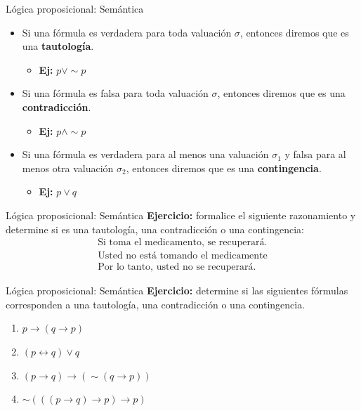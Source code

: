\documentclass{beamer}
\begin{document}
\begin{frame}{Lógica proposicional: Semántica}
  \begin{itemize}[<+->]
    \item Si una fórmula es verdadera para toda valuación $\sigma$, entonces
          diremos que es una \textbf{tautología}.
          \begin{itemize}
            \item \textbf{Ej:} $p \vee \sim p$
          \end{itemize}

    \item Si una fórmula es falsa para toda valuación $\sigma$, entonces diremos
          que es una \textbf{contradicción}.
          \begin{itemize}
            \item \textbf{Ej:} $p \land \sim p$
          \end{itemize}

    \item Si una fórmula es verdadera para al menos una valuación $\sigma_{1}$ y
          falsa para al menos otra valuación $\sigma_{2}$, entonces diremos que
          es una \textbf{contingencia}.
          \begin{itemize}
            \item \textbf{Ej:} $p \vee q$
          \end{itemize}
  \end{itemize}
\end{frame}


\begin{frame}{Lógica proposicional: Semántica}
  \textbf{Ejercicio:} formalice el siguiente razonamiento y determine si es una tautología, una contradicción o una contingencia:
  \[
    \begin{array}{c}
      \text{Si toma el medicamento, se recuperará.} \\
      \text{Usted no está tomando el medicamente} \\
      \hline
      \text{Por lo tanto, usted no se recuperará.}
    \end{array}
  \]
\end{frame}


\begin{frame}{Lógica proposicional: Semántica}
  \textbf{Ejercicio:} determine si las siguientes fórmulas corresponden a una
  tautología, una contradicción o una contingencia.

  \begin{enumerate}
    \item $p \rightarrow (q \rightarrow p)$
    \item $(p \leftrightarrow q) \vee q$
    \item $(p \rightarrow q) \rightarrow (\sim(q \rightarrow p))$
    \item $\sim(((p \rightarrow q) \rightarrow p) \rightarrow p)$
  \end{enumerate}
\end{frame}
\end{document}
